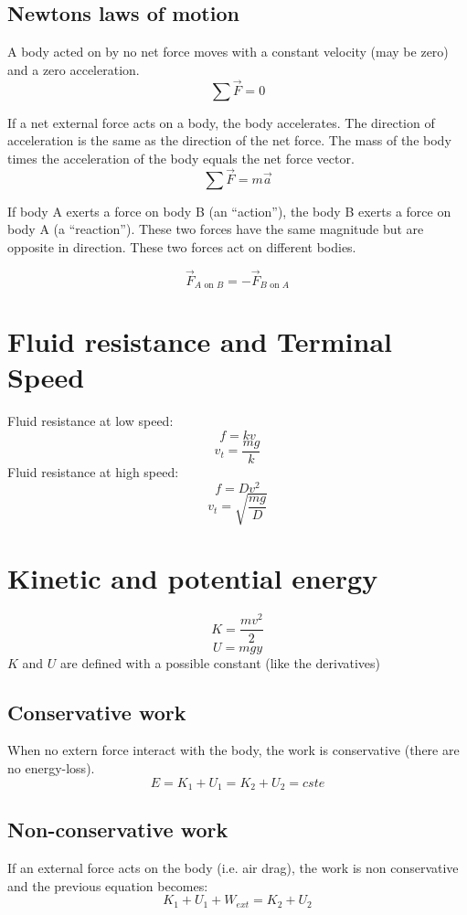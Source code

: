 \documentclass[a4paper,10pt]{article}
\begin{document}
\subsection{Newtons laws of motion}

A body acted on by no net force moves with a constant velocity (may be zero) and a zero acceleration.
\[ \sum \vec{F} = 0 \]

If a net external force acts on a body, the body accelerates. The direction of acceleration is the same as the direction of the net force. The mass of the body times the acceleration of the body equals the net force vector.
\[ \sum \vec{F} = m \vec{a} \]

If body A exerts a force on body B (an ``action''), the body B exerts a force on body A (a ``reaction''). These two forces have the same magnitude but are opposite in direction. These two forces act on different bodies. 

\[ \vec{F}_{A\textrm{ on }B} = -\vec{F}_{B\textrm{ on }A} \]

\section{Fluid resistance and Terminal Speed}
Fluid resistance at low speed:
\[ f = kv \]
\[ v_t = \frac{mg}{k} \]
Fluid resistance at high speed:
\[ f = Dv^2 \]
\[ v_t = \sqrt{ \frac{mg}{D} }\]

\section{Kinetic and potential energy}
\[K = \frac{mv^2}{2}\]
\[U = mgy\]
$K$ and $U$ are defined with a possible constant (like the derivatives)

\subsection{Conservative work}
When no extern force interact with the body, the work is conservative (there are no energy-loss).
\[E = K_1 + U_1 = K_2 + U_2 = cste \]

\subsection{Non-conservative work}
If an external force acts on the body (i.e. air drag), the work is non conservative and the previous equation becomes:
\[K_1 + U_1 + W_{ext} = K_2 + U_2\]
\end{document}
